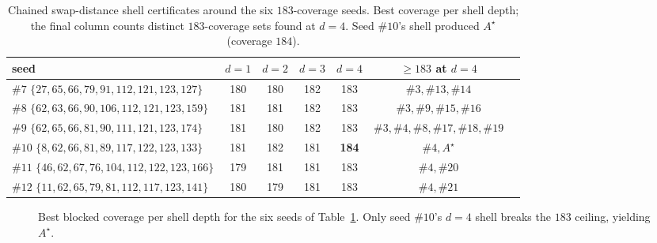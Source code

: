 \documentclass[11pt,a4paper]{article}
\theoremstyle{definition}
\begin{document}
\begin{table}[t]
  \centering
  \caption{Chained swap-distance shell certificates around the six
    $183$-coverage seeds. Best coverage per shell depth; the final
    column counts distinct $183$-coverage sets found at $d=4$. Seed
    $\#10$'s shell produced $A^\star$ (coverage $184$).}
  \label{tab:shells}
  \begin{tabular}{lcccccl}
    \toprule
    seed & $d{=}1$ & $d{=}2$ & $d{=}3$ & $d{=}4$ & $\ge183$ at $d{=}4$ \\
    \midrule
    $\#7$  $\{27,65,66,79,91,112,121,123,127\}$   & 180 & 180 & 182 & 183 & $\#3,\#13,\#14$ \\
    $\#8$  $\{62,63,66,90,106,112,121,123,159\}$  & 181 & 181 & 182 & 183 & $\#3,\#9,\#15,\#16$ \\
    $\#9$  $\{62,65,66,81,90,111,121,123,174\}$   & 181 & 180 & 182 & 183 & $\#3,\#4,\#8,\#17,\#18,\#19$ \\
    $\#10$ $\{8,62,66,81,89,117,122,123,133\}$    & 181 & 182 & 181 & \textbf{184} & $\#4,A^\star$ \\
    $\#11$ $\{46,62,67,76,104,112,122,123,166\}$  & 179 & 181 & 181 & 183 & $\#4,\#20$ \\
    $\#12$ $\{11,62,65,79,81,112,117,123,141\}$   & 180 & 179 & 181 & 183 & $\#4,\#21$ \\
    \bottomrule
  \end{tabular}
\end{table}

\begin{figure}[t]
  \centering
  \caption{Best blocked coverage per shell depth for the six seeds of
    Table~\ref{tab:shells}. Only seed $\#10$'s $d{=}4$ shell breaks the
    $183$ ceiling, yielding $A^\star$.}
  \label{fig:shellbars}
\end{figure}
\end{document}
